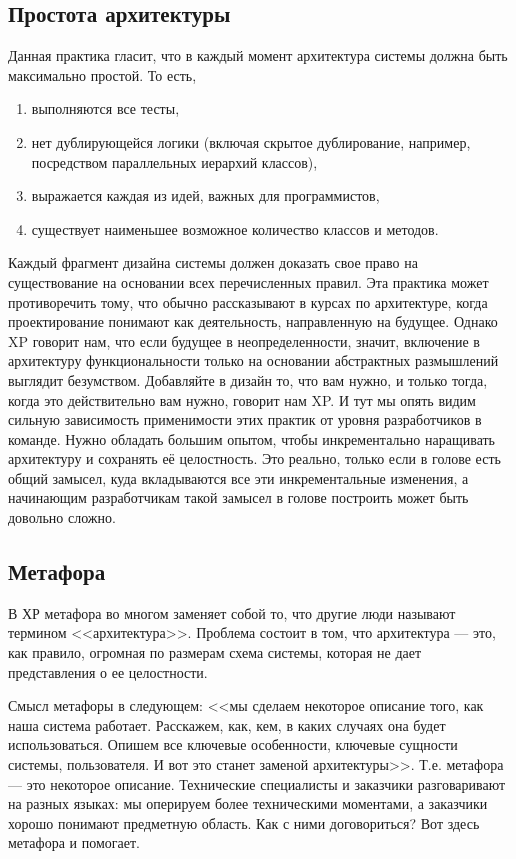 \documentclass{../../text-style}
\begin{document}
\subsection{Простота архитектуры}

Данная практика гласит, что в каждый момент архитектура системы должна быть максимально простой. То есть,

\begin{enumerate}
    \item выполняются все тесты,
    \item нет дублирующейся логики (включая скрытое дублирование, например, посредством параллельных иерархий классов),
    \item выражается каждая из идей, важных для программистов,
    \item существует наименьшее возможное количество классов и методов.
\end{enumerate}

Каждый фрагмент дизайна системы должен доказать свое право на существование на основании всех перечисленных правил. Эта практика может противоречить тому, что обычно рассказывают в курсах по архитектуре, когда проектирование понимают как деятельность, направленную на будущее. Однако XP говорит нам, что если будущее в неопределенности, значит, включение в архитектуру функциональности только на основании абстрактных размышлений выглядит безумством. Добавляйте в дизайн то, что вам нужно, и только тогда, когда это действительно вам нужно, говорит нам XP. И тут мы опять видим сильную зависимость применимости этих практик от уровня разработчиков в команде. Нужно обладать большим опытом, чтобы инкрементально наращивать архитектуру и сохранять её целостность. Это реально, только если в голове есть общий замысел, куда вкладываются все эти инкрементальные изменения, а начинающим разработчикам такой замысел в голове построить может быть довольно сложно.

\subsection{Метафора}

В ХР метафора во многом заменяет собой то, что другие люди называют термином <<архитектура>>. Проблема состоит в том, что архитектура --- это, как правило, огромная по размерам схема системы, которая не дает представления о ее целостности.

Смысл метафоры в следующем: <<мы сделаем некоторое описание того, как наша система работает. Расскажем, как, кем, в каких случаях она будет использоваться. Опишем все ключевые особенности, ключевые сущности системы, пользователя. И вот это станет заменой архитектуры>>. Т.е. метафора --- это некоторое описание. Технические специалисты и заказчики разговаривают на разных языках:  мы оперируем более техническими моментами, а заказчики хорошо понимают предметную область. Как с ними договориться? Вот здесь метафора и помогает.
\end{document}
